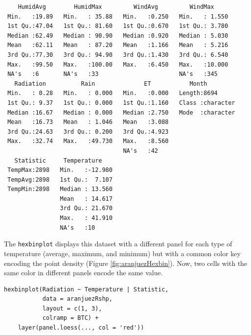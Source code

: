 \documentclass[smallroyalvopaper]{memoir}
\begin{document}
\begin{verbatim}
    HumidAvg        HumidMax         WindAvg         WindMax      
 Min.   :19.89   Min.   : 35.88   Min.   :0.250   Min.   : 1.550  
 1st Qu.:47.04   1st Qu.: 81.60   1st Qu.:0.670   1st Qu.: 3.780  
 Median :62.49   Median : 90.90   Median :0.920   Median : 5.030  
 Mean   :62.11   Mean   : 87.20   Mean   :1.166   Mean   : 5.216  
 3rd Qu.:77.30   3rd Qu.: 94.90   3rd Qu.:1.430   3rd Qu.: 6.540  
 Max.   :99.50   Max.   :100.00   Max.   :6.450   Max.   :10.000  
 NA's   :6       NA's   :33                       NA's   :345     
   Radiation          Rain              ET           Month          
 Min.   : 0.28   Min.   : 0.000   Min.   :0.000   Length:8694       
 1st Qu.: 9.37   1st Qu.: 0.000   1st Qu.:1.160   Class :character  
 Median :16.67   Median : 0.000   Median :2.750   Mode  :character  
 Mean   :16.73   Mean   : 1.046   Mean   :3.088                     
 3rd Qu.:24.63   3rd Qu.: 0.200   3rd Qu.:4.923                     
 Max.   :32.74   Max.   :49.730   Max.   :8.560                     
                                  NA's   :42                        
   Statistic     Temperature     
 TempMax:2898   Min.   :-12.980  
 TempAvg:2898   1st Qu.:  7.107  
 TempMin:2898   Median : 13.560  
                Mean   : 14.617  
                3rd Qu.: 21.670  
                Max.   : 41.910  
                NA's   :10
\end{verbatim}

The \texttt{hexbinplot} displays this dataset with a different panel for
each type of temperature (average, maximum, and minimum) but with a
common color key encoding the point density (Figure
\ref{fig:aranjuezHexbin}). Now, two cells with the same color in
different panels encode the same value. 


\lstset{language=r,label= ,caption= ,captionpos=b,numbers=none}
\begin{lstlisting}
hexbinplot(Radiation ~ Temperature | Statistic,
           data = aranjuezRshp,
           layout = c(1, 3),
           colramp = BTC) +
    layer(panel.loess(..., col = 'red'))
\end{lstlisting}
\end{document}
